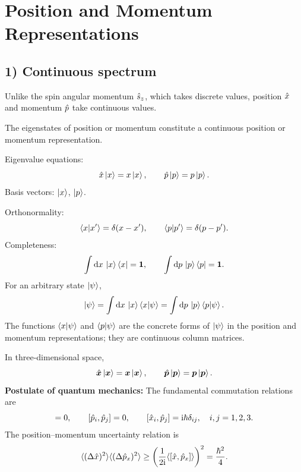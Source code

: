 \section{Position and Momentum Representations}
\subsection*{1) Continuous spectrum}
Unlike the spin angular momentum $\hat{s}_z$, which takes discrete values, position $\hat{x}$ and momentum $\hat{p}$ take continuous values.

The eigenstates of position or momentum constitute a continuous position or momentum representation.

Eigenvalue equations:
\begin{equation}
\hat{x}\left|x\right\rangle=x\left|x\right\rangle,\qquad\hat{p}\left|p\right\rangle=p\left|p\right\rangle.
\end{equation}
Basis vectors: $\left|x\right\rangle$, $\left|p\right\rangle$.

Orthonormality:
\begin{equation}
\left\langle x\middle|x'\right\rangle=\delta(x-x'),\qquad\left\langle p\middle|p'\right\rangle=\delta(p-p').
\end{equation}
Completeness:
\begin{equation}
\int\mathrm{d} x\,\left|x\right\rangle\left\langle x\right|=\mathbf1,\qquad
\int\mathrm{d} p\,\left|p\right\rangle\left\langle p\right|=\mathbf1.
\end{equation}
For an arbitrary state $\left|\psi\right\rangle$,
\begin{equation}
\left|\psi\right\rangle=\int\mathrm{d} x\,\left|x\right\rangle\left\langle x\middle|\psi\right\rangle
=\int\mathrm{d} p\,\left|p\right\rangle\left\langle p\middle|\psi\right\rangle.
\end{equation}
The functions $\left\langle x\middle|\psi\right\rangle$ and $\left\langle p\middle|\psi\right\rangle$ are the concrete forms of $\left|\psi\right\rangle$ in the position and momentum representations; they are continuous column matrices.

In three-dimensional space,
\begin{equation}
\hat{\bm{x}}\left|\bm{x}\right\rangle=\bm{x}\left|\bm{x}\right\rangle,\qquad
\hat{\bm{p}}\left|\bm{p}\right\rangle=\bm{p}\left|\bm{p}\right\rangle.
\end{equation}
\textbf{Postulate of quantum mechanics:} The fundamental commutation relations are
\begin{equation}
[\op x_i,\op x_j]=0,\qquad [\op p_i,\op p_j]=0,\qquad
[\op x_i,\op p_j]=\ii\hbar\delta_{ij},\quad i,j=1,2,3.
\end{equation}
The position--momentum uncertainty relation is
\begin{equation}
\langle(\Delta\hat{x})^2\rangle\langle(\Delta\hat{p}_x)^2\rangle
\ge\left(\frac1{2\mathrm{i}}\langle[\hat{x},\hat{p}_x]\rangle\right)^2=\frac{\hbar^2}{4}.
\end{equation}
